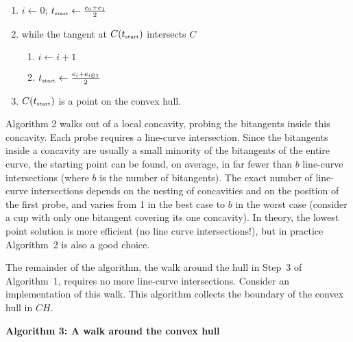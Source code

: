 \documentclass{sig-alternate}
\begin{document}
\begin{enumerate}

\item $i \leftarrow 0$; $t_{\mbox{\tiny{start}}} \leftarrow \frac{e_0 + e_1}{2}$
\item while the tangent at $C(t_{\mbox{\tiny{start}}})$ intersects $C$
\begin{enumerate}
\item	$i \leftarrow i + 1$
\item	$t_{\mbox{\tiny{start}}} \leftarrow \frac{e_{i} + e_{i \oplus 1}}{2}$
\end{enumerate}
\item $C(t_{\mbox{\tiny{start}}})$ is a point on the convex hull.
\end{enumerate}

Algorithm 2 walks out of a local concavity, probing the bitangents inside this concavity.
Each probe requires a line-curve intersection.
Since the bitangents inside a concavity are usually a small minority of the 
bitangents of the entire curve, 
the starting point can be found, on average, in far fewer than $b$ line-curve intersections
(where $b$ is the number of bitangents).
The exact number of line-curve intersections depends on the nesting of concavities and on
the position of the first probe, and varies from 1 in the best case to $b$ in the worst case
(consider a cup with only one bitangent covering its one concavity).
In theory, the lowest point solution is more efficient (no line curve intersections!), 
but in practice Algorithm~2 is also a good choice.

The remainder of the algorithm, the walk around the hull in Step~3 of Algorithm~1, 
requires no more line-curve intersections.
Consider an implementation of this walk.
This algorithm collects the boundary of the convex hull in $CH$.


\vspace{.2in}

\centerline{{\bf Algorithm 3: A walk around the convex hull}}
\end{document}
